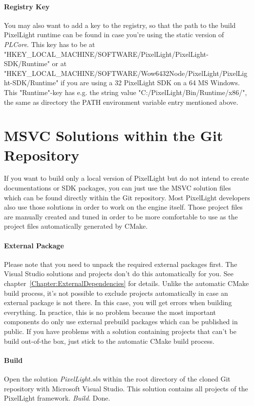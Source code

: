 \paragraph{Registry Key}
You may also want to add a key to the registry, so that the path to the build PixelLight runtime can be found in case you're using the static version of \emph{PLCore}. This key has to be at "HKEY\_LOCAL\_MACHINE/SOFTWARE/PixelLight/PixelLight-SDK/Runtime" or at "HKEY\_LOCAL\_MACHINE/SOFTWARE/Wow6432Node/PixelLight/PixelLight-SDK/Runtime" if you are using a \SI{32}{\bit} PixelLight SDK on a \SI{64}{\bit} \ac{MS} Windows. This "Runtime"-key has e.g. the string value "C:/PixelLight/Bin/Runtime/x86/", the same as directory the PATH environment variable entry mentioned above.




\section{\ac{MSVC} Solutions within the Git Repository}
If you want to build only a local version of PixelLight but do not intend to create documentations or \ac{SDK} packages, you can just use the \ac{MSVC} solution files which can be found directly within the Git repository. Most PixelLight developers also use those solutions in order to work on the engine itself. Those project files are manually created and tuned in order to be more comfortable to use as the project files automatically generated by CMake.


\paragraph{External Package}
Please note that you need to unpack the required external packages first. The Visual Studio solutions and projects don't do this automatically for you. See chapter~\ref{Chapter:ExternalDependencies} for details. Unlike the automatic CMake build process, it's not possible to exclude projects automatically in case an external package is not there. In this case, you will get errors when building everything. In practice, this is no problem because the most important components do only use external prebuild packages which can be published in public. If you have problems with a solution containing projects that can't be build out-of-the box, just stick to the automatic CMake build process.


\paragraph{Build}
Open the solution \emph{PixelLight.sln} within the root directory of the cloned Git repository with Microsoft Visual Studio. This solution contains all projects of the PixelLight framework. \emph{Build}. Done.




